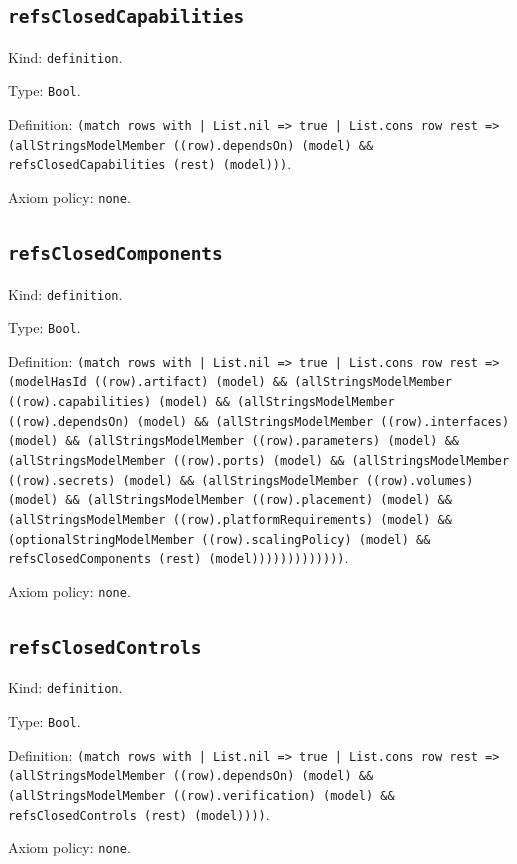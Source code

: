 \documentclass[11pt]{article}
\begin{document}
\subsection*{\texttt{refsClosedCapabilities}}
\noindent Kind: \texttt{definition}.\par
\noindent Type: \texttt{Bool}.\par
\noindent Definition: \texttt{(match rows with | List.nil => true | List.cons row rest => (allStringsModelMember ((row).dependsOn) (model) \&\& refsClosedCapabilities (rest) (model)))}.\par
\noindent Axiom policy: \texttt{none}.\par
\subsection*{\texttt{refsClosedComponents}}
\noindent Kind: \texttt{definition}.\par
\noindent Type: \texttt{Bool}.\par
\noindent Definition: \texttt{(match rows with | List.nil => true | List.cons row rest => (modelHasId ((row).artifact) (model) \&\& (allStringsModelMember ((row).capabilities) (model) \&\& (allStringsModelMember ((row).dependsOn) (model) \&\& (allStringsModelMember ((row).interfaces) (model) \&\& (allStringsModelMember ((row).parameters) (model) \&\& (allStringsModelMember ((row).ports) (model) \&\& (allStringsModelMember ((row).secrets) (model) \&\& (allStringsModelMember ((row).volumes) (model) \&\& (allStringsModelMember ((row).placement) (model) \&\& (allStringsModelMember ((row).platformRequirements) (model) \&\& (optionalStringModelMember ((row).scalingPolicy) (model) \&\& refsClosedComponents (rest) (model)))))))))))))}.\par
\noindent Axiom policy: \texttt{none}.\par
\subsection*{\texttt{refsClosedControls}}
\noindent Kind: \texttt{definition}.\par
\noindent Type: \texttt{Bool}.\par
\noindent Definition: \texttt{(match rows with | List.nil => true | List.cons row rest => (allStringsModelMember ((row).dependsOn) (model) \&\& (allStringsModelMember ((row).verification) (model) \&\& refsClosedControls (rest) (model))))}.\par
\noindent Axiom policy: \texttt{none}.\par
\end{document}
